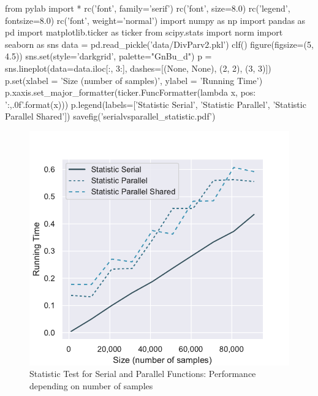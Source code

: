 \documentclass[11pt]{article}
\begin{document}
\begin{pycode}
from pylab import *
rc('font', family='serif')
rc('font', size=8.0)
rc('legend', fontsize=8.0)
rc('font', weight='normal')
import numpy as np
import pandas as pd
import matplotlib.ticker as ticker
from scipy.stats import norm
import seaborn as sns
data = pd.read_pickle('data/DivParv2.pkl')
clf()
figure(figsize=(5, 4.5))
sns.set(style='darkgrid', palette="GnBu_d")
p = sns.lineplot(data=data.iloc[:, 3:], dashes=[(None, None), (2, 2), (3, 3)])
p.set(xlabel = 'Size (number of samples)', ylabel = 'Running Time')
p.xaxis.set_major_formatter(ticker.FuncFormatter(lambda x, pos: '{:,.0f}'.format(x)))
p.legend(labels=['Statistic Serial', 'Statistic Parallel', 'Statistic Parallel Shared'])
savefig('serialvsparallel_statistic.pdf')
\end{pycode}

\begin{figure}[H]
    \begin{center}
        \includegraphics{serialvsparallel_statistic.pdf}
    \end{center}
    \caption{Statistic Test for Serial and Parallel Functions: Performance depending on number of samples}\label{fig:StatisticTest}
\end{figure}
\end{document}
